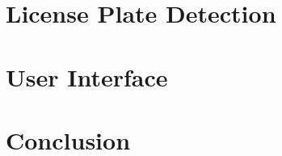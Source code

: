 \documentclass[titlepage, twocolumn]{article}
\begin{document}
\section{License Plate Detection}

\section{User Interface}

\section{Conclusion}
\end{document}
